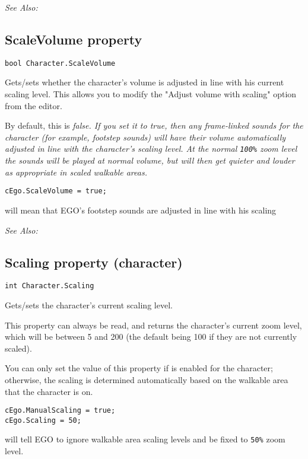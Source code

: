 \it{See Also:} 


\subsection{ScaleVolume property}\label{Character.ScaleVolume}%

\begin{verbatim}
bool Character.ScaleVolume
\end{verbatim}
Gets/sets whether the character's volume is adjusted in line with his
current scaling level. This allows you to modify the "Adjust volume with scaling" option
from the editor.

By default, this is \it{false}. If you set it to \it{true}, then any frame-linked
sounds for the character (for example, footstep sounds) will have their volume
automatically adjusted in line with the character's scaling level. At the normal \verb$100%$
zoom level the sounds will be played at normal volume, but will then get quieter
and louder as appropriate in scaled walkable areas.

\begin{verbatim}
cEgo.ScaleVolume = true;
\end{verbatim}
will mean that EGO's footstep sounds are adjusted in line with his scaling

\it{See Also:} 


\subsection{Scaling property (character)}\label{Character.Scaling}%

\begin{verbatim}
int Character.Scaling
\end{verbatim}
Gets/sets the character's current scaling level.

This property can always be read, and returns the character's current zoom level, which
will be between 5 and 200 (the default being 100 if they are not currently scaled).

You can only set the value of this property if 
is enabled for the character; otherwise, the scaling is determined automatically based on
the walkable area that the character is on.

\begin{verbatim}
cEgo.ManualScaling = true;
cEgo.Scaling = 50;
\end{verbatim}
will tell EGO to ignore walkable area scaling levels and be fixed to \verb$50%$ zoom level.

